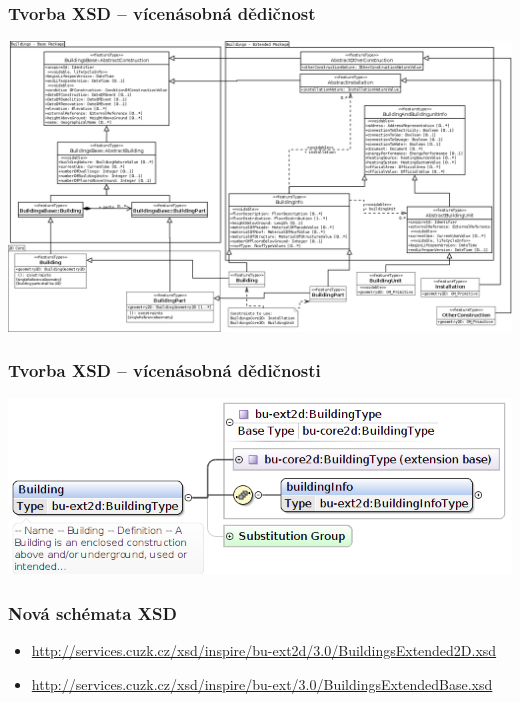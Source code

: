 \begin{frame}
\frametitle{Tvorba XSD -- vícenásobná dědičnost}
\begin{center}
\includegraphics[scale=0.15]{obrazky/BuildingsExtended2D.png}
\end{center}
\end{frame}

\begin{frame}
\frametitle{Tvorba XSD -- vícenásobná dědičnosti}
\begin{center}
\includegraphics[scale=0.4]{obrazky/BU_dedicnost_info.png}
\end{center}
\end{frame}

\begin{frame}
\frametitle{Nová schémata XSD}
\begin{itemize}
\item \url{http://services.cuzk.cz/xsd/inspire/bu-ext2d/3.0/BuildingsExtended2D.xsd}
\item \url{http://services.cuzk.cz/xsd/inspire/bu-ext/3.0/BuildingsExtendedBase.xsd}
\end{itemize}
\end{frame}

